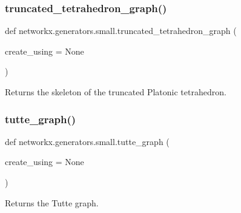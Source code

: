 \subsubsection{\texorpdfstring{truncated\+\_\+tetrahedron\+\_\+graph()}{truncated\_tetrahedron\_graph()}}
{\footnotesize\ttfamily def networkx.\+generators.\+small.\+truncated\+\_\+tetrahedron\+\_\+graph (\begin{DoxyParamCaption}\item[{}]{create\+\_\+using = {\ttfamily None} }\end{DoxyParamCaption})}

\begin{DoxyVerb}Returns the skeleton of the truncated Platonic tetrahedron.\end{DoxyVerb}
 \mbox{\label{namespacenetworkx_1_1generators_1_1small_a59657eaf647e09900a96d73e49061513}} 
\subsubsection{\texorpdfstring{tutte\+\_\+graph()}{tutte\_graph()}}
{\footnotesize\ttfamily def networkx.\+generators.\+small.\+tutte\+\_\+graph (\begin{DoxyParamCaption}\item[{}]{create\+\_\+using = {\ttfamily None} }\end{DoxyParamCaption})}

\begin{DoxyVerb}Returns the Tutte graph.\end{DoxyVerb}
 